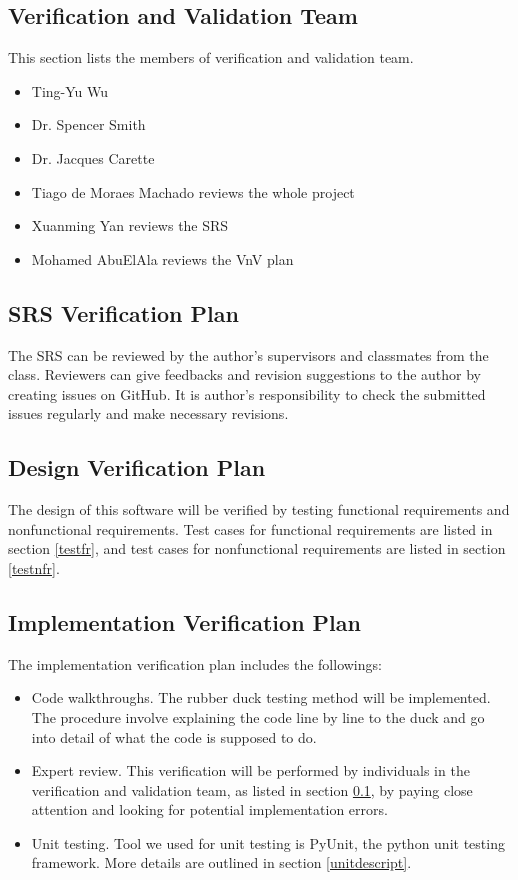 \documentclass[12pt, titlepage]{article}
\begin{document}
\subsection{Verification and Validation Team} \label{VnVteam}
This section lists the members of verification and validation team.
\begin{itemize}
	\item Ting-Yu Wu
	\item Dr. Spencer Smith
	\item Dr. Jacques Carette
	\item Tiago de Moraes Machado reviews the whole project
	\item Xuanming Yan reviews the SRS
	\item Mohamed AbuElAla reviews the VnV plan
\end{itemize}

\subsection{SRS Verification Plan} \label{SRSplan}
The SRS can be reviewed by the author's supervisors and classmates from the 
class. Reviewers can give feedbacks and revision suggestions to the author by 
creating issues on GitHub. It is author's responsibility to check the submitted 
issues regularly and make necessary revisions.

\subsection{Design Verification Plan} \label{designplan}
The design of this software will be verified by testing functional requirements 
and nonfunctional requirements. Test cases for functional requirements are 
listed in section \ref{testfr}, and test cases for nonfunctional requirements 
are listed in section \ref{testnfr}.

\subsection{Implementation Verification Plan} \label{implplan}
The implementation verification plan includes the followings:
\begin{itemize}
	\item Code walkthroughs. The rubber duck testing method will be 
	implemented. The procedure involve explaining the code line by line to the 
	duck and go into detail of what the code is supposed to do. 
	\item Expert review. This verification will be performed by individuals in 
	the verification and validation team, as listed in section \ref{VnVteam}, 
	by paying close attention and looking for potential implementation errors. 
	\item Unit testing. Tool we used for unit testing is PyUnit, the python 
	unit testing framework. More details are outlined in section 
	\ref{unitdescript}.
\end{itemize}
\end{document}
